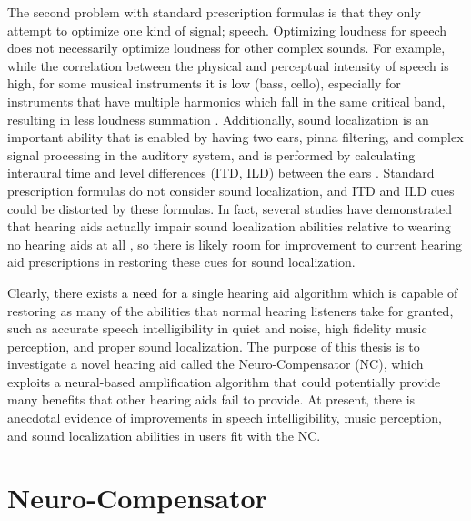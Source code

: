 The second problem with standard prescription formulas is that they only attempt to optimize one kind of signal; speech.  Optimizing loudness for speech does not necessarily optimize loudness for other complex sounds.  For example, while the correlation between the physical and perceptual intensity of speech is high, for some musical instruments it is low (bass, cello), especially for instruments that have multiple harmonics which fall in the same critical band, resulting in less loudness summation \cite{Chasin2004}.  Additionally, sound localization is an important ability that is enabled by having two ears, pinna filtering, and complex signal processing in the auditory system, and is performed by calculating interaural time and level differences (ITD, ILD) between the ears \cite{Middlebrooks1991}.  Standard prescription formulas do not consider sound localization, and ITD and ILD cues could be distorted by these formulas.  In fact, several studies have demonstrated that hearing aids actually impair sound localization abilities relative to wearing no hearing aids at all \cite{Noble1990, VandenBogaert2006, Keidser2006}, so there is likely room for improvement to current hearing aid prescriptions in restoring these cues for sound localization.

Clearly, there exists a need for a single hearing aid algorithm which is capable of restoring as many of the abilities that normal hearing listeners take for granted, such as accurate speech intelligibility in quiet and noise, high fidelity music perception, and proper sound localization.  The purpose of this thesis is to investigate a novel hearing aid called the Neuro-Compensator (NC), which exploits a neural-based amplification algorithm \cite{Bondy2004} that could potentially provide many benefits that other hearing aids fail to provide.  At present, there is anecdotal evidence of improvements in speech intelligibility, music perception, and sound localization abilities in users fit with the NC.

\section{Neuro-Compensator}
